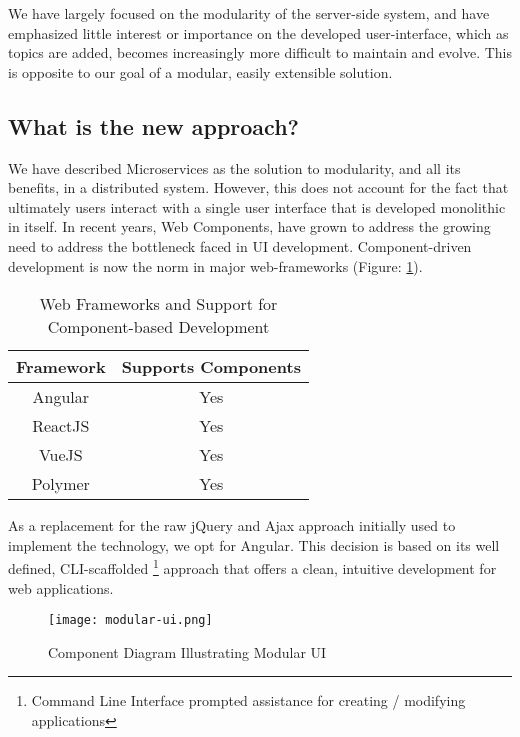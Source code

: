 We have largely focused on the modularity of the server-side system, and have emphasized little interest or importance on the developed user-interface, which as topics are added, becomes increasingly more difficult to maintain and evolve. This is opposite to our goal of a modular, easily extensible solution.

\subsection{What is the new approach?}

We have described Microservices as the solution to modularity, and all its benefits, in a distributed system. However, this does not account for the fact that ultimately users interact with a single user interface that is developed monolithic in itself. In recent years, Web Components, have grown to address the growing need to address the bottleneck faced in UI development. Component-driven development is now the norm in major web-frameworks (Figure: \ref{table:webFrameworkComponentSupport}).

\begin{table}[h!]
	\centering
	\begin{tabular}{|c|c|}
		\hline 
		Framework & Supports Components \\ 
		\hline 
		\hline 
		Angular & Yes \\ 
		\hline
		ReactJS & Yes \\ 
		\hline 
		VueJS & Yes \\ 
		\hline
		Polymer & Yes \\ 
		\hline  
	\end{tabular} 
	\caption{Web Frameworks and Support for Component-based Development}
	\label{table:webFrameworkComponentSupport}
\end{table}

As a replacement for the raw jQuery and Ajax approach initially used to implement the technology, we opt for Angular. This decision is based on its well defined, CLI-scaffolded \footnote{Command Line Interface prompted assistance for creating / modifying applications} approach that offers a clean, intuitive development for web applications.

\begin{figure}[h!]
	\centering
	\texttt{[image: modular-ui.png]}
	\caption{Component Diagram Illustrating Modular UI}
	\label{fig:modularUIComponentDiagram}
\end{figure}


